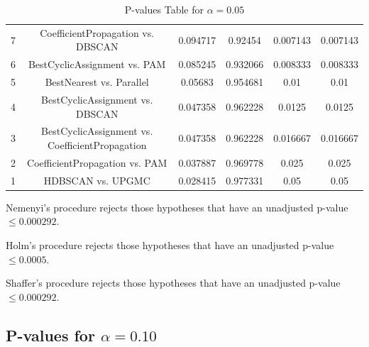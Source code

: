 \documentclass[a4paper,10pt]{article}
\begin{document}
\begin{landscape}
\begin{table}[!htp]
\begin{tabular}{cccccc}
7&CoefficientPropagation vs. DBSCAN&0.094717&0.92454&0.007143&0.007143\\
6&BestCyclicAssignment vs. PAM&0.085245&0.932066&0.008333&0.008333\\
5&BestNearest vs. Parallel&0.05683&0.954681&0.01&0.01\\
4&BestCyclicAssignment vs. DBSCAN&0.047358&0.962228&0.0125&0.0125\\
3&BestCyclicAssignment vs. CoefficientPropagation&0.047358&0.962228&0.016667&0.016667\\
2&CoefficientPropagation vs. PAM&0.037887&0.969778&0.025&0.025\\
1&HDBSCAN vs. UPGMC&0.028415&0.977331&0.05&0.05\\
\hline
\end{tabular}
\caption{P-values Table for $\alpha=0.05$}
\end{table}Nemenyi's procedure rejects those hypotheses that have an unadjusted p-value $\le0.000292$.

Holm's procedure rejects those hypotheses that have an unadjusted p-value $\le0.0005$.

Shaffer's procedure rejects those hypotheses that have an unadjusted p-value $\le0.000292$.

\pagebreak

\subsection{P-values for $\alpha=0.10$}


\end{landscape}
\end{document}
